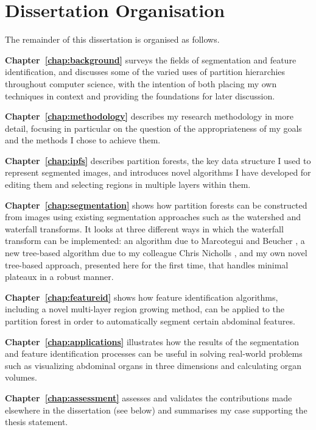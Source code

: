\section{Dissertation Organisation}

The remainder of this dissertation is organised as follows.

\textbf{Chapter~\ref{chap:background}} surveys the fields of segmentation and feature identification, and discusses some of the varied uses of partition hierarchies throughout computer science, with the intention of both placing my own techniques in context and providing the foundations for later discussion.

\textbf{Chapter~\ref{chap:methodology}} describes my research methodology in more detail, focusing in particular on the question of the appropriateness of my goals and the methods I chose to achieve them.

\textbf{Chapter~\ref{chap:ipfs}} describes partition forests, the key data structure I used to represent segmented images, and introduces novel algorithms I have developed for editing them and selecting regions in multiple layers within them.

\textbf{Chapter~\ref{chap:segmentation}} shows how partition forests can be constructed from images using existing segmentation approaches such as the watershed and waterfall transforms. It looks at three different ways in which the waterfall transform can be implemented: an algorithm due to Marcotegui and Beucher \cite{marcotegui05}, a new tree-based algorithm due to my colleague Chris Nicholls \cite{nicholls09}, and my own novel tree-based approach, presented here for the first time, that handles minimal plateaux in a robust manner.

\textbf{Chapter~\ref{chap:featureid}} shows how feature identification algorithms, including a novel multi-layer region growing method, can be applied to the partition forest in order to automatically segment certain abdominal features.

\textbf{Chapter~\ref{chap:applications}} illustrates how the results of the segmentation and feature identification processes can be useful in solving real-world problems such as visualizing abdominal organs in three dimensions and calculating organ volumes.

\textbf{Chapter~\ref{chap:assessment}} assesses and validates the contributions made elsewhere in the dissertation (see below) and summarises my case supporting the thesis statement.

